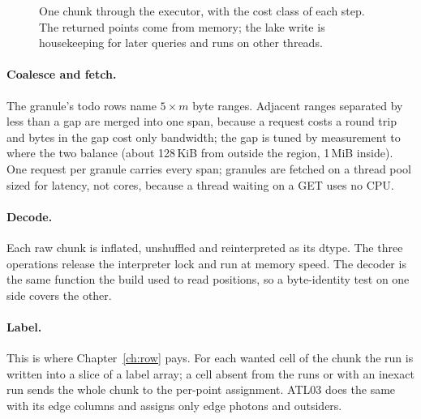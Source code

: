 \documentclass[10pt,a4paper]{article}
\begin{document}
\begin{figure}[tbp]
{}
\caption{One chunk through the executor, with the cost class of each step. The returned points come from memory;
the lake write is housekeeping for later queries and runs on other threads.}
\label{fig:chunkflow}
\end{figure}

\paragraph{Coalesce and fetch.} The granule's todo rows name $5 \times m$ byte ranges. Adjacent ranges separated
by less than a gap are merged into one span, because a request costs a round trip and bytes in the gap cost only
bandwidth; the gap is tuned by measurement to where the two balance (about 128\,KiB from outside the region, 1\,MiB
inside). One request per granule carries every span; granules are fetched on a thread pool sized for latency, not
cores, because a thread waiting on a GET uses no CPU.

\paragraph{Decode.} Each raw chunk is inflated, unshuffled and reinterpreted as its dtype. The three operations
release the interpreter lock and run at memory speed. The decoder is the same function the build used to read
positions, so a byte-identity test on one side covers the other.

\paragraph{Label.} This is where Chapter~\ref{ch:row} pays. For each wanted cell of the chunk the run is written
into a slice of a label array; a cell absent from the runs or with an inexact run sends the whole chunk to the
per-point assignment. ATL03 does the same with its edge columns and assigns only edge photons and outsiders.
\end{document}
